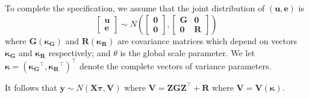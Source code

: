 \documentclass{sydneythesis}
\begin{document}
To complete the specification, we assume that the joint distribution of
\((\boldsymbol{u}, \boldsymbol{e})\) is \[ \begin{bmatrix}
\boldsymbol{u} \\
\boldsymbol{e} 
\end{bmatrix}
\sim N \left( 
\begin{bmatrix}
\boldsymbol{0} \\
\boldsymbol{0} 
\end{bmatrix}, 
\begin{bmatrix}
\boldsymbol{G} & \boldsymbol{0} \\
\boldsymbol{0} & \boldsymbol{R} 
\end{bmatrix}
\right)
\] where \(\boldsymbol{G}(\boldsymbol{\kappa_G})\) and
\(\boldsymbol{R}(\boldsymbol{\kappa_R})\) are covariance matrices which
depend on vectors \(\boldsymbol{\kappa_G}\) and
\(\boldsymbol{\kappa_R}\) respectively; and \(\theta\) is the global
scale parameter. We let
\(\boldsymbol{\kappa} = (\boldsymbol{\kappa_G}^\top, \boldsymbol{\kappa_R}^\top)^\top\)
denote the complete vectors of variance parameters.

It follows that
\(\boldsymbol{y} \sim N(\boldsymbol{X\tau}, \boldsymbol{V})\) where
\(\boldsymbol{V} = \boldsymbol{ZGZ}^\top + \boldsymbol{R}\) where
\(\boldsymbol{V}=\boldsymbol{V}(\boldsymbol{\kappa})\).

\printbibliography[heading=bibintoc]
\end{document}
